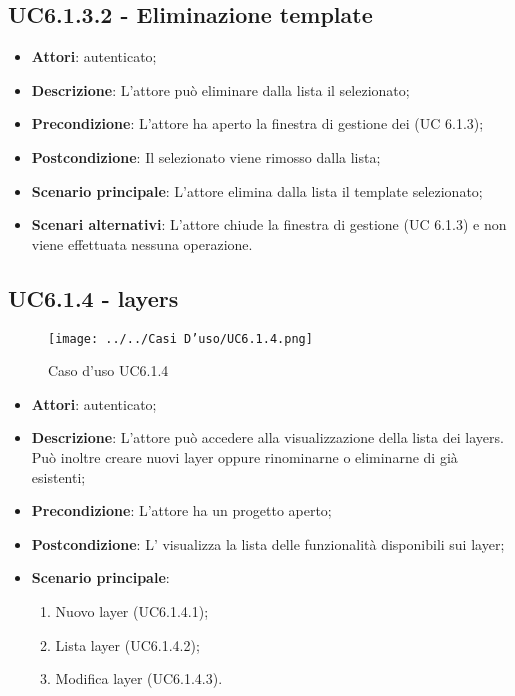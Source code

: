 \subsection{UC6.1.3.2 - Eliminazione template}
\label{ssec:UC6.1.3.2}
\begin{itemize}
\item \textbf{Attori}:  autenticato;
\item \textbf{Descrizione}: L'attore può eliminare dalla lista il  selezionato;
\item \textbf{Precondizione}: L'attore ha aperto la finestra di gestione dei  (UC 6.1.3);
\item \textbf{Postcondizione}: Il  selezionato viene rimosso dalla lista;
\item \textbf{Scenario principale}: L'attore elimina dalla lista il template selezionato;
\item \textbf{Scenari alternativi}: L'attore chiude la finestra di gestione  (UC 6.1.3) e non viene effettuata nessuna operazione.
\end{itemize}
\newpage
\subsection{UC6.1.4 - layers}
\label{ssec:UC6.1.4}
\begin{figure}[h!]
\centering
\texttt{[image: ../../Casi D'uso/UC6.1.4.png]}
\caption{Caso d'uso UC6.1.4}
 \end{figure}
\begin{itemize}
\item \textbf{Attori}:  autenticato;
\item \textbf{Descrizione}: L’attore  può accedere alla visualizzazione della lista dei layers. Può inoltre creare nuovi layer oppure rinominarne o eliminarne di già esistenti;
\item \textbf{Precondizione}: L’attore ha un progetto aperto;
\item \textbf{Postcondizione}: L' visualizza la lista delle funzionalità disponibili sui layer;
\item \textbf{Scenario principale}: \begin{enumerate}\item Nuovo layer (UC6.1.4.1);\item Lista layer (UC6.1.4.2);\item Modifica layer (UC6.1.4.3).
 \end{enumerate}
\end{itemize}
